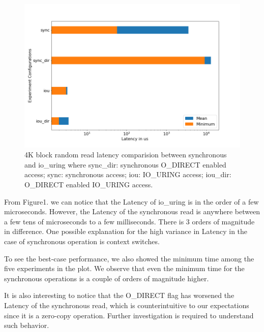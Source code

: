 \documentclass{article}
\begin{document}
\begin{figure}
    \centering
    \includegraphics[scale = 0.3]{latency.png}
    \caption{4K block random read latency comparision between synchronous
    and io\_uring where
    sync\_dir: synchronous O\_DIRECT enabled access;
    sync: synchronous access;
    iou: IO\_URING access;
    iou\_dir: O\_DIRECT enabled IO\_URING access.
    }
    \label{Figure1}
\end{figure}

From Figure1. we can notice that the Latency of io\_uring is in the order of a few microseconds. 
However, the Latency of the synchronous 
read is anywhere between a few tens of microseconds to a few milliseconds. There is 3 orders of magnitude in difference. 
One possible explanation for the high variance in Latency in the case of synchronous operation is context switches. 

To see the best-case performance, we also showed the minimum time among the five experiments in the plot. We observe that even 
the minimum time for the synchronous operations is a couple of orders of magnitude higher.

It is also interesting to notice that the O\_DIRECT flag has worsened the Latency of the synchronous read, which is 
counterintuitive to our expectations since it is a zero-copy operation. Further investigation is required to understand such 
behavior. 
\end{document}
